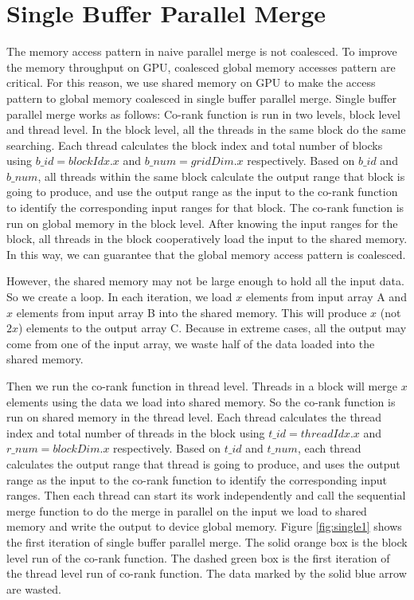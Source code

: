     \section{Single Buffer Parallel Merge}\label{sect:single}
    The memory access pattern in naive parallel merge is not coalesced. To improve the memory 
    throughput on GPU, coalesced global memory accesses pattern are critical. For this reason, 
    we use shared memory on GPU to make the access pattern to global memory coalesced in single
    buffer parallel merge. Single buffer parallel merge works as follows: Co-rank function is
    run in two levels, block level and thread level. In the block level, all the threads in 
    the same block do the same searching. Each thread calculates the block index and total 
    number of blocks using $b\_id = blockIdx.x$ and $b\_num = gridDim.x$ respectively. 
    Based on $b\_id$ and $b\_num$, all threads within the same block calculate the output range 
    that block is going to produce, and use the output range as the input to the co-rank function 
    to identify the corresponding input ranges for that block. The co-rank function is run on 
    global memory in the block level.  
    After knowing the input ranges for the block, all threads in the block cooperatively load the 
    input to the shared memory. In this way, we can guarantee that the global memory access 
    pattern is coalesced. 

    However, the shared memory may not be large enough to hold all the input data. 
    So we create a loop. In each iteration, we load $x$ elements from input array A and 
    $x$ elements from input array B into the shared memory. This will produce $x$ (not $2x$) 
    elements to the output array C. Because in extreme cases, all the output may come from 
    one of the input array, we waste half of the data loaded into the shared memory.
 
    Then we run the co-rank function in thread level. Threads in a block will merge $x$ 
    elements using the data we load into shared memory. So the co-rank function is run on 
    shared memory in the thread level.
    Each thread calculates the thread index and total number of threads in the block
    using $t\_id = threadIdx.x$ and $r\_num = blockDim.x$ respectively. 
    Based on $t\_id$ and $t\_num$, each thread calculates the output range 
    that thread is going to produce, and uses the output range as the input to the co-rank function 
    to identify the corresponding input ranges.  
    Then each thread can start its work independently and call the sequential merge function to do 
    the merge in parallel on the input we load to shared memory and write the output to device 
    global memory. Figure \ref{fig:single1} shows the first iteration of single buffer
    parallel merge. The solid orange box is the block level run of the co-rank function. The 
    dashed green box is the first iteration of the thread level run of co-rank function. 
    The data marked by the solid blue arrow are wasted.  

